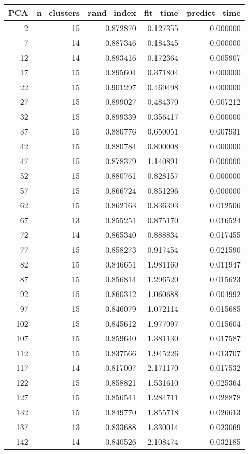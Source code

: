 \begin{tabular}{rrrrr}
\toprule
PCA & n_clusters & rand_index & fit_time & predict_time \\
\midrule
2 & 15 & 0.872870 & 0.127355 & 0.000000 \\
7 & 14 & 0.887346 & 0.184345 & 0.000000 \\
12 & 14 & 0.893416 & 0.172364 & 0.005907 \\
17 & 15 & 0.895604 & 0.371804 & 0.000000 \\
22 & 15 & 0.901297 & 0.469498 & 0.000000 \\
27 & 15 & 0.899027 & 0.484370 & 0.007212 \\
32 & 15 & 0.899339 & 0.356417 & 0.000000 \\
37 & 15 & 0.880776 & 0.650051 & 0.007931 \\
42 & 15 & 0.880784 & 0.800008 & 0.000000 \\
47 & 15 & 0.878379 & 1.140891 & 0.000000 \\
52 & 15 & 0.880761 & 0.828157 & 0.000000 \\
57 & 15 & 0.866724 & 0.851296 & 0.000000 \\
62 & 15 & 0.862163 & 0.836393 & 0.012506 \\
67 & 13 & 0.855251 & 0.875170 & 0.016524 \\
72 & 14 & 0.865340 & 0.888834 & 0.017455 \\
77 & 15 & 0.858273 & 0.917454 & 0.021590 \\
82 & 15 & 0.846651 & 1.981160 & 0.011947 \\
87 & 15 & 0.856814 & 1.296520 & 0.015623 \\
92 & 15 & 0.860312 & 1.060688 & 0.004992 \\
97 & 15 & 0.846079 & 1.072114 & 0.015685 \\
102 & 15 & 0.845612 & 1.977097 & 0.015604 \\
107 & 15 & 0.859640 & 1.381130 & 0.017587 \\
112 & 15 & 0.837566 & 1.945226 & 0.013707 \\
117 & 14 & 0.817007 & 2.171170 & 0.017532 \\
122 & 15 & 0.858821 & 1.531610 & 0.025364 \\
127 & 15 & 0.856541 & 1.284711 & 0.028878 \\
132 & 15 & 0.849770 & 1.855718 & 0.026613 \\
137 & 13 & 0.833688 & 1.330014 & 0.023069 \\
142 & 14 & 0.840526 & 2.108474 & 0.032185 \\

\end{tabular}
